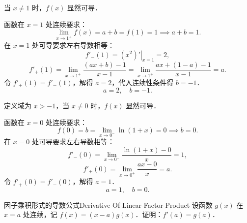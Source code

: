 \begin{solution}

    当 $x \neq 1$ 时，$f(x)$ 显然可导．

    函数在 $x = 1$ 处连续要求：
    \begin{equation}
        \lim_{x\to 1^+} f(x) = a + b = f(1) = 1 \implies a + b = 1.
    \end{equation}
    在 $x = 1$ 处可导要求左右导数相等：
    \begin{equation}
        f'_-(1) = \left. (x^2)' \right|_{x=1} = 2,
    \end{equation}
    \begin{equation}
        f'_+(1) = \lim_{x\to 1^+} \frac{(ax + b) - 1}{x - 1} = \lim_{x\to 1^+} \frac{ax + (1 - a) - 1}{x - 1} = a.
    \end{equation}
    令 $f'_+(1) = f'_-(1)$，解得 $a = 2$，代入连续性条件得 $b = -1$．
    \begin{equation}
        \boxed{a = 2, \quad b = -1.}
    \end{equation}


    定义域为 $x > -1$，当 $x \neq 0$ 时，$f(x)$ 显然可导．

    函数在 $x = 0$ 处连续要求：
    \begin{equation}
        f(0) = b = \lim_{x\to 0^-} \ln(1 + x) = 0 \implies b = 0.
    \end{equation}
    在 $x = 0$ 处可导要求左右导数相等：
    \begin{equation}
        f'_-(0) = \lim_{x\to 0^-} \frac{\ln(1 + x) - 0}{x} = 1,
    \end{equation}
    \begin{equation}
        f'_+(0) = \lim_{x\to 0^+} \frac{ax - 0}{x} = a.
    \end{equation}
    令 $f'_+(0) = f'_-(0)$，解得 $a = 1$．
    \begin{equation}
        \boxed{a = 1, \quad b = 0.}
    \end{equation}
\end{solution}

\begin{problem}{因子乘积形式的导数公式}{Derivative-Of-Linear-Factor-Product}
    设函数 $g(x)$ 在 $x = a$ 处连续，记 $f(x) = (x - a)g(x)$．证明：$f'(a) = g(a)$．
\end{problem}


